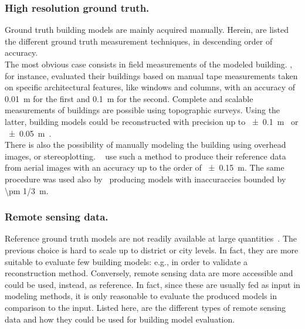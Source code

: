         \subsubsection{High resolution ground truth.}
            Ground truth building models are mainly acquired manually.
            Herein, are listed the different ground truth measurement techniques, in descending order of accuracy.\\

            The most obvious case consists in field measurements of the modeled building.
            \textcite{dick2004modelling}, for instance, evaluated their buildings based on manual tape measurements taken on specific architectural features, like windows and columns, with an accuracy of \SI{0.01}{\m} for the first and \SI{0.1}{\m} for the second.
            Complete and scalable measurements of buildings are possible using topographic surveys.
            Using the latter, building models could be reconstructed with precision up to \SI{\pm 0.1}{\m}~\parencite{henricsson19973} or \SI{\pm 0.05}{\m}~\parencite{vogtle2003quality}.\\
            There is also the possibility of manually modeling the building using overhead images, or stereoplotting.
            ~\textcite{zebedin2008fusion} use such a method to produce their reference data from aerial images with an accuracy up to the order of \SI{\pm 0.15}{\m}.
            The same procedure was used also by~\textcite{jaynes2003recognition} producing models with inaccuraccies bounded by \SI[fraction-function = \sfrac]{\pm 1/3}{\m}.

        \subsubsection{Remote sensing data.}
            Reference ground truth models are not readily available at large quantities~\parencite{schuster2003new}.
            The previous choice is hard to scale up to district or city levels.
            In fact, they are more suitable to evaluate few building models: e.g., in order to validate a reconstruction method.
            Conversely, remote sensing data are more accessible and could be used, instead, as reference.
            In fact, since these are usually fed as input in modeling methods, it is only reasonable to evaluate the produced models in comparison to the input.
            Listed here, are the different types of remote sensing data and how they could be used for building model evaluation.\\

